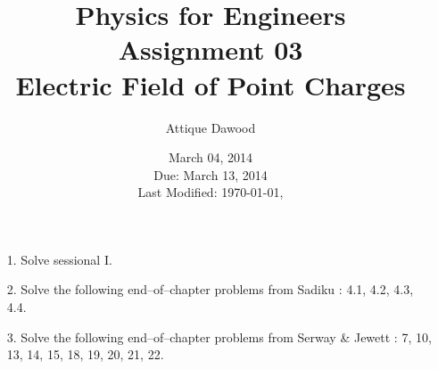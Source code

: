 \documentclass[12pt,a4paper]{article}
\title{\vspace{-3cm}Physics for Engineers\\Assignment 03\\Electric Field of Point Charges}
\author{Attique Dawood}
\date{March 04, 2014\\Due: March 13, 2014\\[0.2cm] Last Modified: \today, \currenttime}
\begin{document}
\maketitle
\begin{itemize}
\item[1.] Solve sessional I.
\item[2.] Solve the following end--of--chapter problems from Sadiku \cite[Ch. 4, pg. 155]{Sadiku}: 4.1, 4.2, 4.3, 4.4.
\item[3.] Solve the following end--of--chapter problems from Serway \& Jewett \cite[Ch. 23, pg. 730--732]{Serway}: 7, 10, 13, 14, 15, 18, 19, 20, 21, 22.
\end{itemize}


\end{document}
